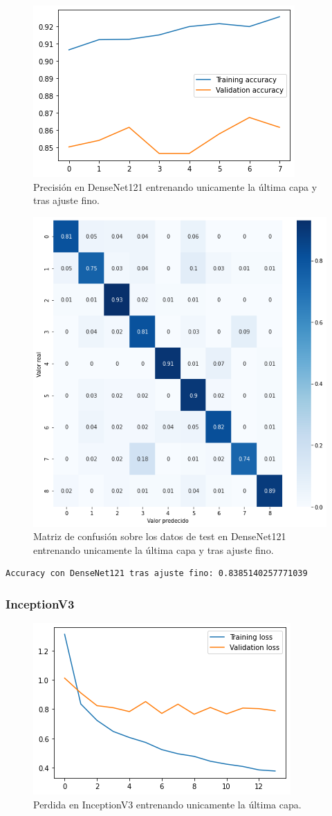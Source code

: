 \begin{figure}[H]
  \centering
  \includegraphics[width=0.5\linewidth]{Imagenes/entrenamiento_redes/ult/densenet_fine_acc.png}
  \caption{Precisión en DenseNet121 entrenando unicamente la última capa y tras ajuste fino.}
\end{figure}

\begin{figure}[H]
  \centering
  \includegraphics[width=0.5\linewidth]{Imagenes/entrenamiento_redes/ult/densenet_fine_matriz.png}
  \caption{Matriz de confusión sobre los datos de test en DenseNet121 entrenando unicamente la última capa y tras ajuste fino.}
\end{figure}


\begin{lstlisting}
Accuracy con DenseNet121 tras ajuste fino: 0.8385140257771039
\end{lstlisting}



\subsubsection{InceptionV3}

\begin{figure}[H]
  \centering
  \includegraphics[width=0.5\linewidth]{Imagenes/entrenamiento_redes/ult/inception_ult_loss.png}
  \caption{Perdida en InceptionV3 entrenando unicamente la última capa.}
\end{figure}

